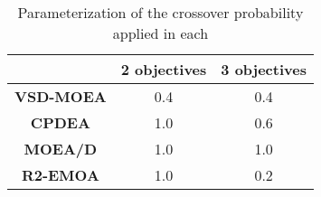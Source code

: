 \begin{table}[t]
\centering
\caption{Parameterization of the crossover probability applied in each \MOEA{}} \label{tab:xover}
\begin{tabular}{c|c|c}
\hline
                  & \textbf{2 objectives} & \textbf{3 objectives} \\ \hline
\textbf{VSD-MOEA} & 0.4                   & 0.4                   \\ \hline
\textbf{CPDEA}    & 1.0                   & 0.6                   \\ \hline
\textbf{MOEA/D}   & 1.0                   & 1.0                   \\ \hline
\textbf{R2-EMOA}  & 1.0                   & 0.2                   \\ \hline
\end{tabular}%
\end{table}

